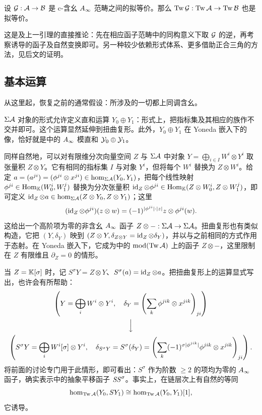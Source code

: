 \begin{lemma}\label{st:3.25}
设 $\mathcal G:\mathcal A\to\mathcal B$ 是 c-含幺 $A_\infty$ 范畴之间的拟等价。那么 $\operatorname{Tw}\mathcal G:\operatorname{Tw}\mathcal A\to\operatorname{Tw}\mathcal B$ 也是拟等价。
\end{lemma}
这是及上一引理的直接推论：先在相应函子范畴中的同构意义下取 $\mathcal G$ 的逆，再考察诱导的函子及自然变换即可。另一种较少依赖形式体系、更多借助正合三角的方法，见后文的证明。

\subsection{基本运算}\label{sec:3o}
从这里起，恢复之前的通常假设：所涉及的一切都上同调含幺。

$\Sigma\mathcal A$ 对象的形式允许定义直和运算 $Y_0\oplus Y_1$：形式上，把指标集及其相应的族作不交并即可。这个运算显然延伸到扭曲复形。此外，$Y_0\oplus Y_1$ 在 Yoneda 嵌入下的像，恰好就是中的 $A_\infty$ 模直和 $\mathcal Y_0\oplus\mathcal Y_1$。

同样自然地，可以对有限维分次向量空间 $Z$ 与 $\Sigma\mathcal A$ 中对象 $Y=\bigoplus_{i\in I}W^i\otimes Y^i$ 取张量积 $Z\otimes Y$。它有相同的指标集 $I$ 与对象 $Y^i$，但将每个 $W^i$ 替换为 $Z\otimes W^i$。给定 $a=(a^{ji})=(\phi^{ji}\otimes x^{ji})\in\hom_{\Sigma\mathcal A}(Y_0,Y_1)$，把每个线性映射 $\phi^{ji}\in\operatorname{Hom}_{\mathbb K}(W_0^i,W_1^j)$ 替换为分次张量积 $\operatorname{id}_Z\otimes\phi^{ji}\in\operatorname{Hom}_{\mathbb K}(Z\otimes W_0^i,Z\otimes W_1^j)$，即可定义 $\operatorname{id}_Z\otimes a\in\hom_{\Sigma\mathcal A}(Z\otimes Y_0,Z\otimes Y_1)$；这里
\[
(\operatorname{id}_Z\otimes\phi^{ji})(z\otimes w)=(-1)^{|\phi^{ji}|\cdot|z|}z\otimes\phi^{ji}(w).
\]
这给出一个高阶项为零的非含幺 $A_\infty$ 函子 $Z\otimes-:\Sigma\mathcal A\to\Sigma\mathcal A$。扭曲复形也有类似构造，它把 $(Y,\delta_Y)$ 映到 $(Z\otimes Y,\delta_{Z\otimes Y}=\operatorname{id}_Z\otimes\delta_Y)$，并以与之前相同的方式作用于态射。在 Yoneda 嵌入下，它成为中的 $\operatorname{mod}(\operatorname{Tw}\mathcal A)$ 上的函子 $Z\otimes-$，这里限制在 $Z$ 有限维且 $\partial_Z=0$ 的情形。

当 $Z=\mathbb K[\sigma]$ 时，记 $S^{\sigma} Y=Z\otimes Y$、$S^{\sigma}(a)=\operatorname{id}_Z\otimes a$。把扭曲复形上的运算显式写出，也许会有所帮助：
\[
\begin{gathered}
\left(Y=\bigoplus_iW^i\otimes Y^i,\quad\delta_Y=\left(\sum_k\phi^{jik}\otimes x^{jik}\right)_{ji}\right)\\
\Big\downarrow\\
\left(S^{\sigma} Y=\bigoplus_iW^i[\sigma]\otimes Y^i,\quad
\delta_{S^{\sigma} Y}=S^{\sigma}(\delta_Y)=\left(\sum_k(-1)^{\sigma|\phi^{jik}|}\phi^{jik}\otimes x^{jik}\right)_{ji}\right).
\end{gathered}
\]
将前面的讨论专门用于此情形，即可看出：$S^{\sigma}$ 作为阶数 $\geq2$ 的项均为零的 $A_\infty$ 函子，确实表示中的抽象平移函子 $\mathit{SS}^{\sigma}$。事实上，在链层次上有自然的等同
\[
\hom_{\operatorname{Tw}\mathcal A}(Y_0,SY_1)\cong\hom_{\operatorname{Tw}\mathcal A}(Y_0,Y_1)[1],
\]
它诱导。

